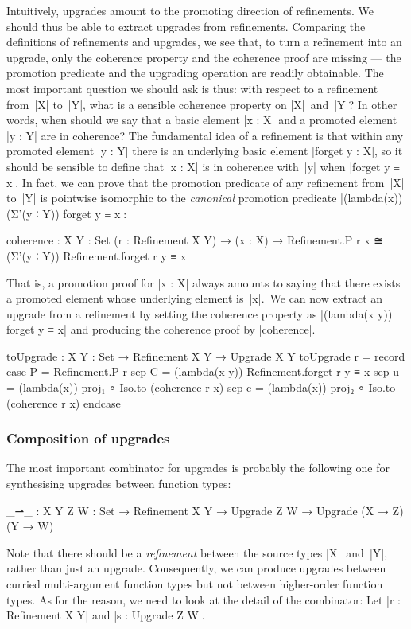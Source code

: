 Intuitively, upgrades amount to the promoting direction of refinements.
We should thus be able to extract upgrades from refinements.
Comparing the definitions of refinements and upgrades, we see that, to turn a refinement into an upgrade, only the coherence property and the coherence proof are missing --- the promotion predicate and the upgrading operation are readily obtainable.
The most important question we should ask is thus: with respect to a refinement from~|X| to~|Y|, what is a sensible coherence property on |X|~and~|Y|?
In other words, when should we say that a basic element |x : X| and a promoted element |y : Y| are in coherence?
The fundamental idea of a refinement is that within any promoted element |y : Y| there is an underlying basic element |forget y : X|, so it should be sensible to define that |x : X| is in coherence with~|y| when |forget y ≡ x|.
In fact, we can prove that the promotion predicate of any refinement from~|X| to~|Y| is pointwise isomorphic to the \emph{canonical} promotion predicate |(lambda(x)) (Σ'(y ∶ Y)) forget y ≡ x|:
\begin{code}
coherence :  {X Y : Set} (r : Refinement X Y) →
             (x : X) → Refinement.P r x ≅ (Σ'(y ∶ Y)) Refinement.forget r y ≡ x
\end{code}
That is, a promotion proof for |x : X| always amounts to saying that there exists a promoted element whose underlying element is~|x|.\
We can now extract an upgrade from a refinement by setting the coherence property as |(lambda(x y)) forget y ≡ x| and producing the coherence proof by |coherence|.
\begin{code}
toUpgrade : {X Y : Set} → Refinement X Y → Upgrade X Y
toUpgrade r = record  case  P  =  Refinement.P r
                      sep   C  =  (lambda(x y)) Refinement.forget r y ≡ x
                      sep   u  =  (lambda(x)) proj₁  ∘ Iso.to (coherence r x)
                      sep   c  =  (lambda(x)) proj₂  ∘ Iso.to (coherence r x) endcase
\end{code}



\subsubsection{Composition of upgrades}
The most important combinator for upgrades is probably the following one for synthesising upgrades between function types:
\begin{code}
_⇀_ :  {X Y Z W : Set} →
       Refinement X Y → Upgrade Z W → Upgrade (X → Z) (Y → W)
\end{code}
Note that there should be a \emph{refinement} between the source types |X|~and~|Y|, rather than just an upgrade.
Consequently, we can produce upgrades between curried multi-argument function types but not between higher-order function types.
As for the reason, we need to look at the detail of the combinator:
Let |r : Refinement X Y| and |s : Upgrade Z W|.


